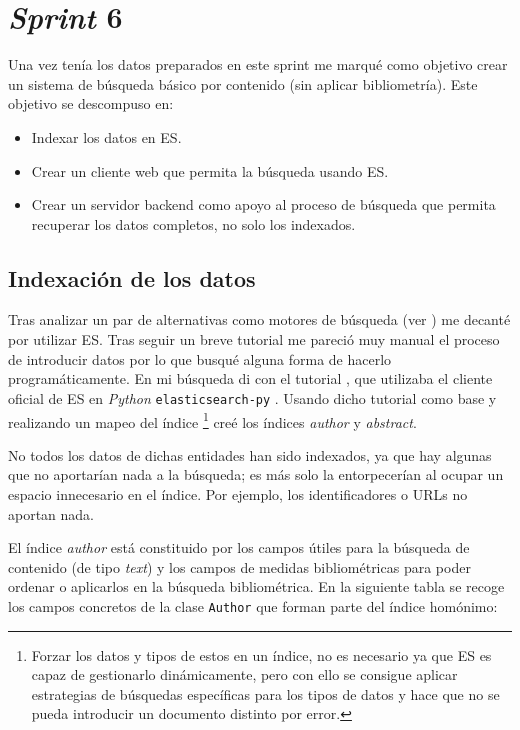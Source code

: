 \section{\textit{Sprint} 6}
Una vez tenía los datos preparados en este sprint me marqué como objetivo crear un sistema de búsqueda básico por contenido (sin aplicar bibliometría). Este objetivo se descompuso en:
\begin{itemize}
	\item Indexar los datos en \acrlong{ES}.
	\item Crear un cliente web que permita la búsqueda usando \acrshort{ES}.
	\item Crear un servidor \gls{backend} como apoyo al proceso de búsqueda que permita recuperar los datos completos, no solo los indexados.
\end{itemize}

\subsection{Indexación de los datos}
Tras analizar un par de alternativas como motores de búsqueda (ver ) me decanté por utilizar \acrshort{ES}. Tras seguir un breve tutorial me pareció muy manual el proceso de introducir datos por lo que busqué alguna forma de hacerlo programáticamente. En mi búsqueda di con el tutorial \cite{indexingES}, que utilizaba el cliente oficial de \acrshort{ES} en \textit{Python} \texttt{elasticsearch-py} \cite{ES_client}. Usando dicho tutorial como base y realizando un mapeo del índice \footnote[4]{Forzar los datos y tipos de estos en un índice, no es necesario ya que \acrshort{ES} es capaz de gestionarlo dinámicamente, pero con ello se consigue aplicar estrategias de búsquedas específicas para los tipos de datos y hace que no se pueda introducir un documento distinto por error.}\cite{mappingES} creé los índices \textit{author} y \textit{abstract}.

No todos los datos de dichas entidades han sido indexados, ya que hay algunas que no aportarían nada a la búsqueda; es más solo la entorpecerían al ocupar un espacio innecesario en el índice. Por ejemplo, los identificadores o \acrshort{URL}s no aportan nada.

El índice \textit{author} está constituido por los campos útiles para la búsqueda de contenido (de tipo \textit{text}) y los campos de medidas bibliométricas para poder ordenar o aplicarlos en la búsqueda bibliométrica. En la siguiente tabla se recoge los campos concretos de la clase \texttt{Author} que forman parte del índice homónimo:


